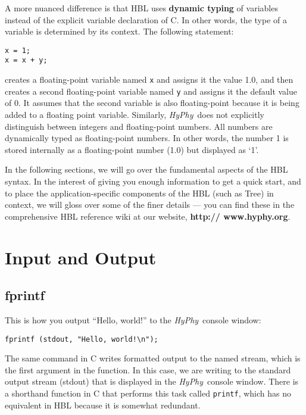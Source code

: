 \documentclass[12pt,twoside,openright]{book}
\newcommand{\hyphy}{\textit{HyPhy}}
\begin{document}
A more nuanced difference is that HBL uses {\bf dynamic typing} of variables instead of the explicit variable declaration of C.  In other words, the type of a variable is determined by its context.  The following statement:


\begin{leftbar}
\begin{verbatim}
x = 1;
x = x + y;
\end{verbatim}
\end{leftbar}

\noindent creates a floating-point variable named {\tt x} and assigns it the value 1.0, and then creates a second floating-point variable named {\tt y} and assigns it the default value of 0.  It assumes that the second variable is also floating-point because it is being added to a floating point variable.   Similarly, \hyphy\ does not explicitly distinguish between integers and floating-point numbers.  All numbers are dynamically typed as floating-point numbers.  In other words, the number 1 is stored internally as a floating-point number (1.0) but displayed as `1'.  



In the following sections, we will go over the fundamental aspects of the HBL syntax.  In the interest of giving you enough information to get a quick start, and to place the application-specific components of the HBL (such as Tree) in context, we will gloss over some of the finer details --- you can find these in the comprehensive HBL reference wiki at our website, \textbf{http:// www.hyphy.org}.  


\section {Input and Output}\label{io}

\subsection {fprintf}
This is how you output ``Hello, world!'' to the \hyphy\ console window:

\begin{leftbar}
\begin{verbatim}
fprintf (stdout, "Hello, world!\n");
\end{verbatim}
\end{leftbar}

The same command in C writes formatted output to the named stream, which is the first argument in the function.  In this case, we are writing to the standard output stream (stdout) that is displayed in the \hyphy\ console window.  There is a shorthand function in C that performs this task called {\tt printf}, which has no equivalent in HBL because it is somewhat redundant.
\end{document}
